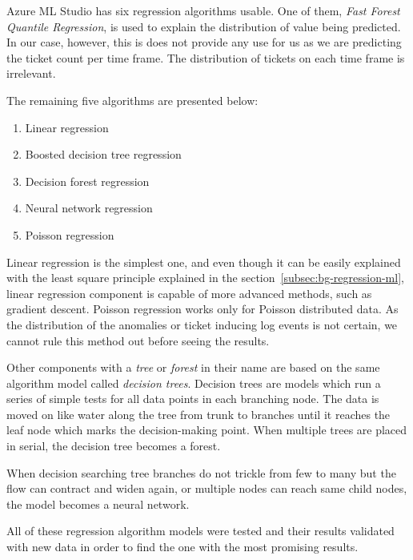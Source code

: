 Azure ML Studio has six regression algorithms usable.
One of them,
\textit{Fast Forest Quantile Regression},
is used to explain the distribution of value being predicted.\cite{azure2021fastforestquantile}
In our case, however,
this is does not provide any use for us
as we are predicting the ticket count per time frame.
The distribution of tickets on each time frame is irrelevant.

The remaining five algorithms are presented below:
\begin{enumerate}
    \item Linear regression~\cite{azure2021linear}
    \item Boosted decision tree regression~\cite{azure2022boosteddecisiontree}
    \item Decision forest regression~\cite{azure2021decisionforest}
    \item Neural network regression~\cite{azure2021neuralnetwork}
    \item Poisson regression~\cite{azure2021poisson}
\end{enumerate}

Linear regression is the simplest one,
and even though it can be easily explained with the least square principle
explained in the section~\ref{subsec:bg-regression-ml},
linear regression component is capable of more advanced methods,
such as gradient descent.
Poisson regression works only for Poisson distributed data.
As the distribution of the anomalies or ticket inducing log events is not certain,
we cannot rule this method out before seeing the results.

Other components with a \textit{tree} or \textit{forest} in their name
are based on the same algorithm model called \textit{decision trees}.
Decision trees are models
which run a series of simple tests
for all data points in each branching node.
The data is moved on like water along the tree from trunk to branches
until it reaches the leaf node which marks the decision-making point.
When multiple trees are placed in serial,
the decision tree becomes a forest.~\cite{azure2021decisionforest}

When decision searching tree branches do not trickle from few to many
but the flow can contract and widen again,
or multiple nodes can reach same child nodes,
the model becomes a neural network.

All of these regression algorithm models
were tested and their results validated with new data
in order to find the one with the most promising results.


